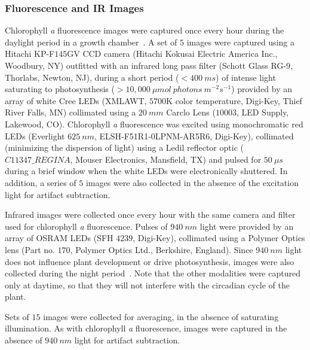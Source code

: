 \subsubsection{Fluorescence and IR Images}
Chlorophyll {\it a} fluorescence images were captured once every hour during the daylight period in a growth chamber~\cite{kramer2015plant}.
A set of $5$ images were captured using a Hitachi KP-F$145$GV CCD camera (Hitachi Kokusai Electric America Inc., Woodbury, NY) outfitted with an infrared long pass filter (Schott Glass RG-$9$, Thorlabs, Newton, NJ), during a short period ($<400~ms$) of intense light saturating to photosynthesis ($>10,000~\mu mol~photons~m^{-2} s^{-1}$) provided by an array of white Cree LEDs (XMLAWT, $5700$K color temperature, Digi-Key, Thief River Falls, MN) collimated using a $20~mm$ Carclo Lens ($10003$, LED Supply, Lakewood, CO).
Chlorophyll {\it a} fluorescence was excited using monochromatic red LEDs (Everlight $625~nm$, ELSH-F51R1-0LPNM-AR5R6, Digi-Key), collimated (minimizing the dispersion of light) using a Ledil reflector optic ($C11347\_REGINA$, Mouser Electronics, Mansfield, TX) and pulsed for $50~\mu s$ during a brief window when the white LEDs were electronically shuttered.
In addition, a series of $5$ images were also collected in the absence of the excitation light for artifact subtraction.

Infrared images were collected once every hour with the same camera and filter used for chlorophyll {\it a} fluorescence.
Pulses of $940~nm$ light were provided by an array of OSRAM LEDs (SFH $4239$, Digi-Key), collimated using a Polymer Optics lens (Part no. $170$, Polymer Optics Ltd., Berkshire, England).
Since $940~nm$ light does not influence plant development or drive photosynthesis, images were also collected during the night period~\cite{eskins1992light}.
Note that the other modalities were captured only at daytime, so that they will not interfere with the circadian cycle of the plant.

Sets of $15$ images were collected for averaging, in the absence of saturating illumination.
As with chlorophyll {\it a} fluorescence, images were captured in the absence of $940~nm$ light for artifact subtraction.



